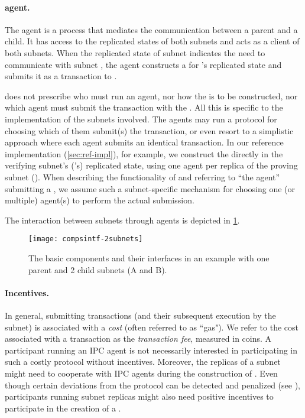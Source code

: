 \paragraph{\ipc agent.}

The \ipc agent is a \gls{process} that mediates the communication between a parent and a child.
It has access to the replicated states of both subnets and acts as a client of both subnets.
When the replicated state of subnet  indicates the need to communicate with subnet ,
the \ipc agent constructs a \pof for 's replicated state and submits it as a transaction to .

\ipc does not prescribe who must run an \ipc agent, nor how the \pof is to be constructed, nor which \ipc agent must submit the transaction with the \pof.
All this is specific to the implementation of the subnets involved.
The \ipc agents may run a protocol for choosing which of them submit(s) the transaction, or even resort to a simplistic approach where each \ipc agent submits an identical transaction.
In our reference implementation (\cref{sec:ref-impl}), for example, we construct the \pof directly in the verifying subnet's ('s) replicated state,
using one \ipc agent per replica of the proving subnet ().
When describing the functionality of \ipc and referring to ``the \ipc agent'' submitting a \pof,
we assume such a subnet-specific mechanism for choosing one (or multiple) \ipc agent(s) to perform the actual submission.

The interaction between subnets through \ipc agents is depicted in \cref{fig:interfaces}.

\begin{figure}[ht]
     \centering
     \texttt{[image: compsintf-2subnets]}
     \caption{The basic \ipc components and their interfaces in an example with one parent and 2 child subnets (A and B).}
     \label{fig:interfaces}
 \end{figure}


\paragraph{Incentives.}

In general, submitting transactions (and their subsequent execution by the subnet) is associated with a \emph{cost} (often referred to as ``gas").
We refer to the cost associated with a transaction as the \emph{transaction fee}, measured in coins.
A participant running an IPC agent is not necessarily interested in participating in such a costly protocol without incentives.
Moreover, the replicas of a subnet might need to cooperate with IPC agents during the construction of \pofsFull.
Even though certain deviations from the protocol can be detected and penalized (see ),
participants running subnet replicas might also need positive incentives to participate in the creation of a \pof.


